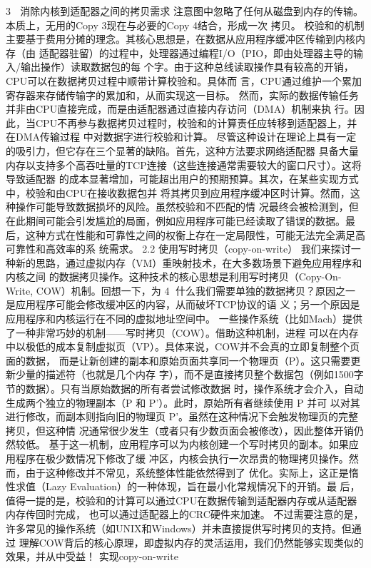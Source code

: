                                                   3
                消除内核到适配器之间的拷贝需求
注意图中忽略了任何从磁盘到内存的传输。本质上，无用的Copy 3现在与必要的Copy 4结合，形成一次
拷贝。
校验和的机制主要基于费用分摊的理念。其核心思想是，在数据从应用程序缓冲区传输到内核内存（由
适配器驻留）的过程中，处理器通过编程I/O（PIO，即由处理器主导的输入/输出操作）读取数据包的每
个字。由于这种总线读取操作具有较高的开销，CPU可以在数据拷贝过程中顺带计算校验和。具体而
言，CPU通过维护一个累加寄存器来存储传输字的累加和，从而实现这一目标。
然而，实际的数据传输任务并非由CPU直接完成，而是由适配器通过直接内存访问（DMA）机制来执
行。因此，当CPU不再参与数据拷贝过程时，校验和的计算责任应转移到适配器上，并在DMA传输过程
中对数据字进行校验和计算。
尽管这种设计在理论上具有一定的吸引力，但它存在三个显著的缺陷。首先，这种方法要求网络适配器
具备大量内存以支持多个高吞吐量的TCP连接（这些连接通常需要较大的窗口尺寸）。这将导致适配器
的成本显著增加，可能超出用户的预期预算。其次，在某些实现方式中，校验和由CPU在接收数据包并
将其拷贝到应用程序缓冲区时计算。然而，这种操作可能导致数据损坏的风险。虽然校验和不匹配的情
况最终会被检测到，但在此期间可能会引发尴尬的局面，例如应用程序可能已经读取了错误的数据。最
后，这种方式在性能和可靠性之间的权衡上存在一定局限性，可能无法完全满足高可靠性和高效率的系
统需求。
2.2 使用写时拷贝（copy-on-write）
我们来探讨一种新的思路，通过虚拟内存（VM）重映射技术，在大多数场景下避免应用程序和内核之间
的数据拷贝操作。这种技术的核心思想是利用写时拷贝（Copy-On-Write, COW）机制。回想一下，为
                                                    4
什么我们需要单独的数据拷贝？原因之一是应用程序可能会修改缓冲区的内容，从而破坏TCP协议的语
义；另一个原因是应用程序和内核运行在不同的虚拟地址空间中。
一些操作系统（比如Mach）提供了一种非常巧妙的机制——写时拷贝（COW）。借助这种机制，进程
可以在内存中以极低的成本复制虚拟页（VP）。具体来说，COW并不会真的立即复制整个页面的数据，
而是让新创建的副本和原始页面共享同一个物理页（P）。这只需要更新少量的描述符（也就是几个内存
字），而不是直接拷贝整个数据包（例如1500字节的数据）。只有当原始数据的所有者尝试修改数据
时，操作系统才会介入，自动生成两个独立的物理副本（P 和 P'）。此时，原始所有者继续使用 P 并可
以对其进行修改，而副本则指向旧的物理页 P'。虽然在这种情况下会触发物理页的完整拷贝，但这种情
况通常很少发生（或者只有少数页面会被修改），因此整体开销仍然较低。
基于这一机制，应用程序可以为内核创建一个写时拷贝的副本。如果应用程序在极少数情况下修改了缓
冲区，内核会执行一次昂贵的物理拷贝操作。然而，由于这种修改并不常见，系统整体性能依然得到了
优化。实际上，这正是惰性求值（Lazy Evaluation）的一种体现，旨在最小化常规情况下的开销。最
后，值得一提的是，校验和的计算可以通过CPU在数据传输到适配器内存或从适配器内存传回时完成，
也可以通过适配器上的CRC硬件来加速。
不过需要注意的是，许多常见的操作系统（如UNIX和Windows）并未直接提供写时拷贝的支持。但通过
理解COW背后的核心原理，即虚拟内存的灵活运用，我们仍然能够实现类似的效果，并从中受益！
实现copy-on-write




